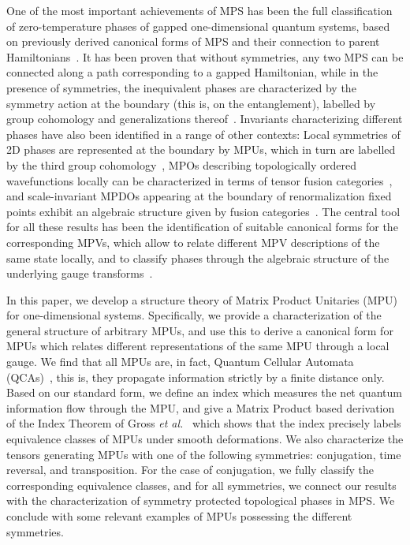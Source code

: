 \documentclass[pra,twocolumn,nofootinbib,superscriptaddress]{revtex4-1}
\begin{document}
One of the most important achievements of MPS has been the full
classification of zero-temperature phases of gapped one-dimensional
quantum systems, based on previously derived canonical forms of MPS and
their connection to parent
Hamiltonians~\cite{perez-garcia:mps-reps}.  It has been proven that
without symmetries, any two MPS can be connected along a path
corresponding to a gapped Hamiltonian, while in the presence of
symmetries, the inequivalent phases are characterized by the symmetry
action at the boundary (this is, on the entanglement), labelled by group
cohomology and generalizations
thereof~\cite{pollmann:1d-sym-protection-prb,chen:1d-phases-rg,schuch:mps-phases}.
Invariants characterizing different phases have also been identified in a
range of other contexts: Local symmetries of 2D phases are represented at
the boundary by MPUs, which in turn are labelled by the third group
cohomology~\cite{chen:2d-spt-phases-peps-ghz}, MPOs describing
topologically ordered wavefunctions locally can be characterized in
terms of tensor fusion
categories~\cite{sahinoglu:mpo-injectivity,bultinck:mpo-anyons}, and
scale-invariant MPDOs appearing at the boundary of renormalization fixed
points exhibit an algebraic structure given by fusion
categories~\cite{cirac:mpdo-rgfp}. The
central tool for all these results has been the identification of suitable
canonical forms for the corresponding MPVs, which allow to relate
different MPV descriptions of the same state locally, and to classify
phases through the algebraic structure of the underlying gauge
transforms~\cite{perez-garcia:mps-reps,cirac:mpdo-rgfp}.

In this paper, we develop a structure theory of Matrix Product Unitaries
(MPU) for one-dimensional systems. Specifically, we provide a
characterization of the general structure of arbitrary MPUs, and use this
to derive a canonical form for MPUs which relates different
representations of the same MPU through a local gauge. We find that all
MPUs are, in fact, Quantum Cellular Automata (QCAs)~\cite{schumacher:qca},
this is, they propagate information strictly by a finite distance only.
Based on our standard form, we define an index which measures the net
quantum information flow through the MPU, and give a Matrix Product based
derivation of the Index Theorem of Gross \emph{et
	al.}~\cite{gross:index-theorem} which
shows that the index precisely labels equivalence classes of MPUs under
smooth deformations.  We also characterize the tensors generating MPUs
with one of the following symmetries: conjugation, time reversal, and
transposition. For the case of conjugation, we fully classify the
corresponding equivalence classes, and for all symmetries, we
connect our results with the characterization of symmetry protected
topological phases in MPS. We conclude with some relevant examples of MPUs
possessing the different symmetries.
\end{document}

